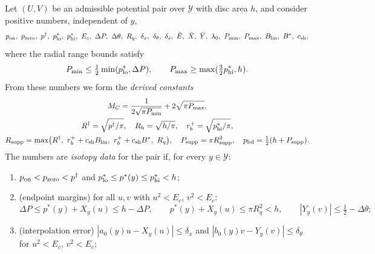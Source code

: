 \begin{definition}\label{def:pln-isotopy-data}
Let $(U,V)$ be an admissible potential pair over $\mathcal Y$ with disc area $h$, and consider positive numbers, independent of $y$,
\[
 p_{\rm on},\ p_{\rm zero},\ p^\dagger,\ p^*_{\rm lo},\ p^*_{\rm hi},\ E_c,\ \Delta P,\ \Delta\theta,\ R_q,\ \delta_x,\ \delta_\theta,\
 \delta_s,\ \bar E,\ \bar X,\ \bar Y,\ \lambda_0,\ P_{\min},\ P_{\max},\ B_{\rm lin},\ B^*,\ c_{\rm sh},
\]
where the radial range bounds satisfy
\[
 P_{\min}\le\tfrac12\min(p^*_{\rm lo},\Delta P),\qquad P_{\max}\ge\max(\tfrac32p^*_{\rm hi},h).
\]
From these numbers we form the \emph{derived constants}
\begin{gather*}
 M_C=\frac1{2\sqrt{\pi P_{\min}}}+2\sqrt{\pi P_{\max}},\\
 R^\dagger=\sqrt{p^\dagger/\pi},\quad R_h=\sqrt{h/\pi},\quad r_b^+=\sqrt{p^*_{\rm hi}/\pi},\\
 R_{\rm supp}=\max\bigl(R^\dagger,\ r_b^++c_{\rm sh}B_{\rm lin},\ r_b^++c_{\rm sh}B^*,\ R_q\bigr),\quad P_{\rm supp}=\pi R_{\rm supp}^2,\quad
 p_{\rm bd}=\tfrac12(h+P_{\rm supp}).
\end{gather*}
The numbers are \emph{isotopy data} for the pair if, for every $y\in\mathcal Y$:
\begin{enumerate}[label=(D\arabic*)]
\item\label{it:pln-D1} $p_{\rm on}<p_{\rm zero}<p^\dagger$ and $p^*_{\rm lo}\le p^*(y)\le p^*_{\rm hi}<h$;
\item\label{it:pln-D2} (endpoint margins) for all $u,v$ with $u^2<E_c$, $v^2<E_c$:
 \[
  \Delta P\le p^*(y)+X_y(u)\le h-\Delta P,\qquad p^*(y)+X_y(u)\le\pi R_q^2<h,\qquad |Y_y(v)|\le\tfrac12-\Delta\theta ;
 \]
\item\label{it:pln-D3} (interpolation error) $|a_0(y)u-X_y(u)|\le\delta_x$ and $|b_0(y)v-Y_y(v)|\le \delta_\theta$ for $u^2<E_c$, $v^2<E_c$;

\end{enumerate}
\end{definition}
